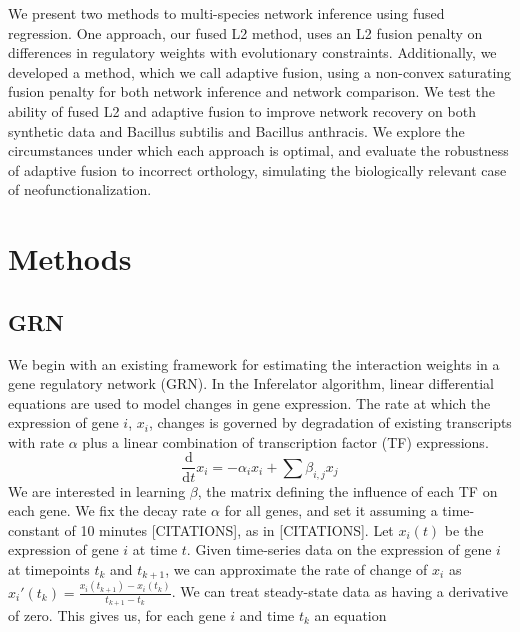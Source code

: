 \documentclass[11pt]{article}
\begin{document}
We present two methods to multi-species network inference using fused regression. One approach, our fused L2 method, uses an L2 fusion penalty on differences in regulatory weights with evolutionary constraints. Additionally, we developed a method, which we call adaptive fusion, using a non-convex saturating fusion penalty for both network inference and network comparison. We test the ability of fused L2 and adaptive fusion to improve network recovery on both synthetic data and Bacillus subtilis and Bacillus anthracis. We explore the circumstances under which each approach is optimal, and evaluate the robustness of adaptive fusion to incorrect orthology, simulating the biologically relevant case of neofunctionalization. 


\section{Methods}
\subsection{GRN}
We begin with an existing framework for estimating the interaction weights in a gene regulatory network (GRN). In the Inferelator algorithm, linear differential equations are used to model changes in gene expression. The rate at which the expression of gene $i$, $x_i$, changes is governed by degradation of existing transcripts with rate $\alpha$ plus a linear combination of transcription factor (TF) expressions.
\begin{equation}
\frac{\mathrm d}{\mathrm d t} x_i = -\alpha_{i}x_{i} + \sum \beta_{i,j}x_{j}
\end{equation}
We are interested in learning $\beta$, the matrix defining the influence of each TF on each gene. We fix the decay rate $\alpha$ for all genes, and set it assuming a time-constant of 10 minutes [CITATIONS], as in [CITATIONS]. Let $x_i(t)$ be the expression of gene $i$ at time $t$. Given time-series data on the expression of gene $i$ at timepoints $t_k$ and $t_{k+1}$, we can approximate the rate of change of $x_i$ as $x_i'(t_k)=\frac{x_i(t_{k+1})-x_i(t_k)}{t_{k+1}-t_k}$. We can treat steady-state data as having a derivative of zero. This gives us, for each gene $i$ and time $t_{k}$ an equation
\end{document}
